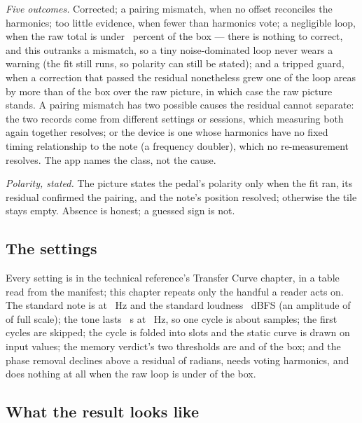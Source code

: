 \documentclass[11pt,a4paper]{article}
\begin{document}
\emph{Five outcomes.} Corrected; a pairing mismatch, when no offset
reconciles the harmonics; too little evidence, when fewer than
\tcMinimumTerms{} harmonics vote; a negligible loop, when the raw total is
under \tcDeadZonePct{}~percent of the box --- there is nothing to correct,
and this outranks a mismatch, so a tiny noise-dominated loop never wears a
warning (the fit still runs, so polarity can still be stated); and a
tripped guard, when a correction that passed the residual nonetheless grew
one of the loop areas by more than \tcMetricGuardTolerance{} of the box
over the raw picture, in which case the raw picture stands. A pairing
mismatch has two possible causes the residual cannot separate: the two
records come from different settings or sessions, which measuring both
again together resolves; or the device is one whose harmonics have no
fixed timing relationship to the note (a frequency doubler), which no
re-measurement resolves. The app names the class, not the cause.

\emph{Polarity, stated.} The picture states the pedal's polarity only when
the fit ran, its residual confirmed the pairing, and the note's position
resolved; otherwise the tile stays empty. Absence is honest; a guessed
sign is not.

\subsection{The settings}

Every setting is in the technical reference's Transfer Curve chapter, in
a table read from the manifest; this chapter repeats only the handful a
reader acts on. The standard note is \tcNote{} at \tcNoteHz{}~Hz and the
standard loudness \tcLevelDBFS{}~dBFS (an amplitude of \tcAmplitude{} of
full scale); the tone lasts \tcDurationS{}~s at \tcSampleRateHz{}~Hz, so
one cycle is about \tcSamplesPerCycle{} samples; the first \tcSkipCycles{}
cycles are skipped; the cycle is folded into \tcBins{} slots and the
static curve is drawn on \tcStaticGrid{} input values; the memory
verdict's two thresholds are \tcMemorylessBelow{} and \tcMemoryFrom{} of
the box; and the phase removal declines above a residual of
\tcResidualToleranceRad{} radians, needs \tcMinimumTerms{} voting
harmonics, and does nothing at all when the raw loop is under
\tcDeadZone{} of the box.

\subsection{What the result looks like}
\end{document}
